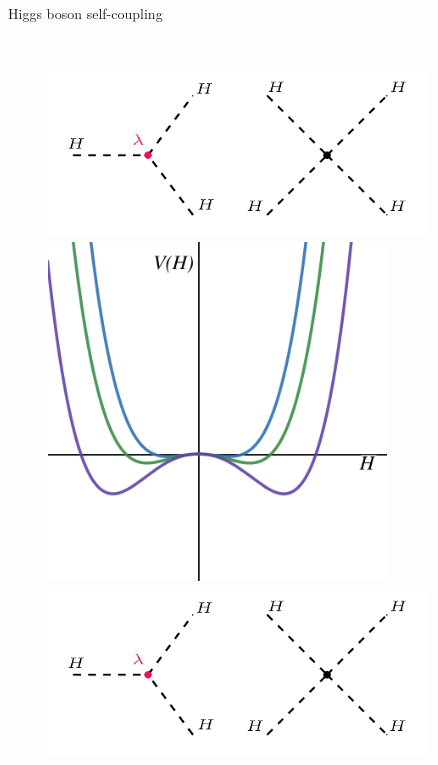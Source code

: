 \begin{frame}{Higgs boson self-coupling}
\begin{columns}
\begin{figure}
    \begin{overprint}
    \centering\includegraphics[width=0.9\textwidth]{Part1/Img/hhh_diagrams.png}
    \centering\includegraphics[width=0.8\textwidth]{Part1/Img/V_H_for_lambda.png}
    \centering\includegraphics[width=0.9\textwidth]{Part1/Img/hhh_diagrams.png}
    \end{overprint}
\end{figure}

\end{columns}    

\end{frame}

